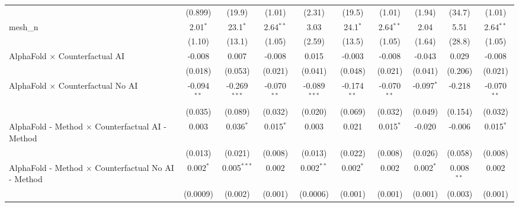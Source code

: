\begin{tabular}{lccccccccc}
                                                               & (0.899)        & (19.9)         & (1.01)         & (2.31)         & (19.5)        & (1.01)         & (1.94)         & (34.7)         & (1.01)\\   
   mesh\_n                                                     & 2.01$^{*}$     & 23.1$^{*}$     & 2.64$^{**}$    & 3.03           & 24.1$^{*}$    & 2.64$^{**}$    & 2.04           & 5.51           & 2.64$^{**}$\\   
                                                               & (1.10)         & (13.1)         & (1.05)         & (2.59)         & (13.5)        & (1.05)         & (1.64)         & (28.8)         & (1.05)\\   
   AlphaFold $\times$ Counterfactual AI                        & -0.008         & 0.007          & -0.008         & 0.015          & -0.003        & -0.008         & -0.043         & 0.029          & -0.008\\   
                                                               & (0.018)        & (0.053)        & (0.021)        & (0.041)        & (0.048)       & (0.021)        & (0.041)        & (0.206)        & (0.021)\\   
   AlphaFold $\times$ Counterfactual No AI                     & -0.094$^{**}$  & -0.269$^{***}$ & -0.070$^{**}$  & -0.089$^{***}$ & -0.174$^{**}$ & -0.070$^{**}$  & -0.097$^{*}$   & -0.218         & -0.070$^{**}$\\   
                                                               & (0.035)        & (0.089)        & (0.032)        & (0.020)        & (0.069)       & (0.032)        & (0.049)        & (0.154)        & (0.032)\\   
   AlphaFold - Method $\times$ Counterfactual AI - Method      & 0.003          & 0.036$^{*}$    & 0.015$^{*}$    & 0.003          & 0.021         & 0.015$^{*}$    & -0.020         & -0.006         & 0.015$^{*}$\\   
                                                               & (0.013)        & (0.021)        & (0.008)        & (0.013)        & (0.022)       & (0.008)        & (0.026)        & (0.058)        & (0.008)\\   
   AlphaFold - Method $\times$ Counterfactual No AI - Method   & 0.002$^{*}$    & 0.005$^{***}$  & 0.002          & 0.002$^{**}$   & 0.002$^{*}$   & 0.002          & 0.002$^{*}$    & 0.008$^{**}$   & 0.002\\   
                                                               & (0.0009)       & (0.002)        & (0.001)        & (0.0006)       & (0.001)       & (0.001)        & (0.001)        & (0.003)        & (0.001)\\   

\end{tabular}

